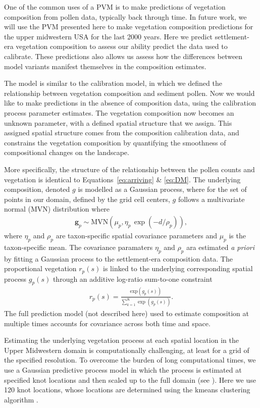 \documentclass[12pt]{article}
\begin{document}
One of the common uses of a PVM is to make predictions of vegetation
composition from pollen data, typically back through time. In future
work, we will use the PVM presented here to make vegetation
composition predictions for the upper midwestern USA for the last 2000
years. Here we predict settlement-era vegetation composition to assess
our ability predict the data used to calibrate. These predictions also
allows us assess how the differences between model variants manifest
themselves in the composition estimates.

The model is similar to the calibration model, in which we defined the
relationship between vegetation composition and sediment pollen. Now
we would like to make predictions in the absence of composition data,
using the calibration process parameter estimates. The vegetation
composition now becomes an unknown parameter, with a defined spatial
structure that we assign. This assigned spatial structure comes from
the composition calibration data, and constrains the vegetation
composition by quantifying the smoothness of compositional changes on
the landscape.

More specifically, the structure of the relationship between the
pollen counts and vegetation is identical to
Equations~\ref{eq:arriving} \& \ref{eq:DM}. The underlying
composition, denoted $g$ is modelled as a Gaussian process, where for
the set of points in our domain, defined by the grid cell centers, $g$
follows a multivariate normal (MVN) distribution where
\begin{align*}
\bm{g}_p \sim \text{MVN}(\mu_p, \eta_p \, \exp(-d/\rho_p)),
\end{align*}
where $\eta_p$ and $\rho_p$ are taxon-specific spatial covariance
parameters and $\mu_p$ is the taxon-specific mean.  The covariance
paramaters $\eta_p$ and $\rho_p$ ara estimated \textit{a priori} by
fitting a Gaussian process to the settlement-era composition data.
The proportional vegetation $r_p(s)$ is linked to the underlying
corresponding spatial process $g_p(s)$ through an additive log-ratio
sum-to-one constraint
\begin{align*}
r_p(s) = \frac{ \text{exp}(g_p(s))}{ \sum_{k=1}^K \exp (g_p(s)) }.
\end{align*} 
The full prediction model (not described here) used to estimate
composition at multiple times accounts for covariance across both time
and space. 

Estimating the underlying vegetation process at each spatial location
in the Upper Midwestern domain is computationally challenging, at
least for a grid of the specified resolution. To overcome the burden
of long computational times, we use a Gaussian predictive process
model in which the process is estimated at specified knot locations
and then scaled up to the full domain (see
\cite{finley2009improving}). Here we use 120 knot locations, whose
locations are determined using the kmeans clustering algorithm
\cite{macqueen1967some}.
\end{document}
